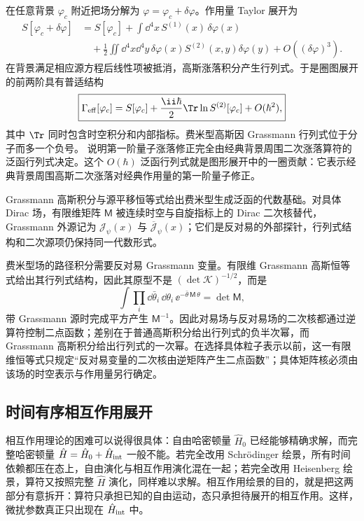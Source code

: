 在任意背景 $\varphi_c$ 附近把场分解为
$\varphi=\varphi_c+\delta\varphi$。作用量 Taylor 展开为
\begin{align*}
S[\varphi_c+\delta\varphi]
&=S[\varphi_c]
+\int\dd^4 x\,S^{(1)}(x)\,\delta\varphi(x)\\
&\quad+\frac12\iint\dd^4 x\dd^4 y\,
\delta\varphi(x)S^{(2)}(x,y)\delta\varphi(y)+O((\delta\varphi)^3).
\end{align*}
在背景满足相应源方程后线性项被抵消，高斯涨落积分产生行列式。于是圈图展开的前两阶具有普适结构
\begin{equation}
\boxed{
\Gamma_{\rm eff}[\varphi_c]
=S[\varphi_c]
+\frac{\ii\hbar}{2}\Tr\ln S^{(2)}[\varphi_c]
+O(\hbar^2),}
\label{eq:one_loop_effective_action_general}
\end{equation}
其中 $\Tr$ 同时包含时空积分和内部指标。费米型高斯因 Grassmann 行列式位于分子而多一个负号。 说明第一阶量子涨落修正完全由经典背景周围二次涨落算符的泛函行列式决定。这个 $O(\hbar)$ 泛函行列式就是图形展开中的一圈贡献：它表示经典背景周围高斯二次涨落对经典作用量的第一阶量子修正。

Grassmann 高斯积分与源平移恒等式给出费米型生成泛函的代数基础。对具体 Dirac 场，有限维矩阵 $\mathsf M$ 被连续时空与自旋指标上的 Dirac 二次核替代，Grassmann 外源记为 $\mathcal J_\psi(x)$ 与 $\overline{\mathcal J}_\psi(x)$；它们是反对易的外部探针，行列式结构和二次源项仍保持同一代数形式。

费米型场的路径积分需要反对易 Grassmann 变量。有限维 Grassmann 高斯恒等式给出其行列式结构，因此其原型不是 $(\det\mathcal K)^{-1/2}$，而是
\begin{equation}
 \int\prod_i\dd\bar\theta_i\,\dd\theta_i\,
 \ee^{-\bar\theta\,\mathsf M\,\theta}
 =\det\mathsf M,
 \label{eq:grassmann-det-r2}
\end{equation}
带 Grassmann 源时完成平方产生 $\mathsf M^{-1}$。因此对易场与反对易场的二次核都通过逆算符控制二点函数；差别在于普通高斯积分给出行列式的负半次幂，而 Grassmann 高斯积分给出行列式的一次幂。在选择具体粒子表示以前，这一有限维恒等式只规定“反对易变量的二次核由逆矩阵产生二点函数”；具体矩阵核必须由该场的时空表示与作用量另行确定。



\subsection{时间有序相互作用展开}

相互作用理论的困难可以说得很具体：自由哈密顿量 $\hat H_0$ 已经能够精确求解，而完整哈密顿量 $\hat H=\hat H_0+\hat H_{\rm int}$ 一般不能。若完全改用 Schr\"odinger 绘景，所有时间依赖都压在态上，自由演化与相互作用演化混在一起；若完全改用 Heisenberg 绘景，算符又按照完整 $\hat H$ 演化，同样难以求解。相互作用绘景的目的，就是把这两部分有意拆开：算符只承担已知的自由运动，态只承担待展开的相互作用。这样，微扰参数真正只出现在 $\hat H_{\rm int}$ 中。

